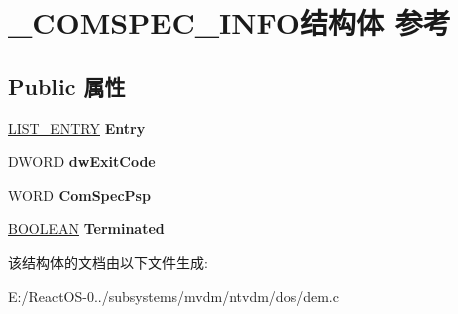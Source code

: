\hypertarget{struct___c_o_m_s_p_e_c___i_n_f_o}{}\section{\+\_\+\+C\+O\+M\+S\+P\+E\+C\+\_\+\+I\+N\+F\+O结构体 参考}
\label{struct___c_o_m_s_p_e_c___i_n_f_o}
\subsection*{Public 属性}
\begin{DoxyCompactItemize}
\item 
\mbox{\label{struct___c_o_m_s_p_e_c___i_n_f_o_aad6bcd398989b869a4701574cc923699}} 
\hyperlink{struct___l_i_s_t___e_n_t_r_y}{L\+I\+S\+T\+\_\+\+E\+N\+T\+RY} {\bfseries Entry}
\item 
\mbox{\label{struct___c_o_m_s_p_e_c___i_n_f_o_ae34e60dd21833cc9cb5e872598c0487e}} 
D\+W\+O\+RD {\bfseries dw\+Exit\+Code}
\item 
\mbox{\label{struct___c_o_m_s_p_e_c___i_n_f_o_af5d9aaee45c0bedc6e381d754a90519f}} 
W\+O\+RD {\bfseries Com\+Spec\+Psp}
\item 
\mbox{\label{struct___c_o_m_s_p_e_c___i_n_f_o_a4356e39c4855569bf94971e970d9f9f2}} 
\hyperlink{_processor_bind_8h_a112e3146cb38b6ee95e64d85842e380a}{B\+O\+O\+L\+E\+AN} {\bfseries Terminated}
\end{DoxyCompactItemize}


该结构体的文档由以下文件生成\+:\begin{DoxyCompactItemize}
\item 
E\+:/\+React\+O\+S-\/0../subsystems/mvdm/ntvdm/dos/dem.\+c\end{DoxyCompactItemize}
